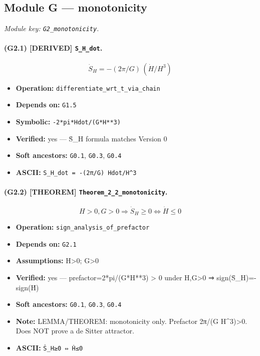 \documentclass[11pt,a4paper]{article}
\theoremstyle{remark}\newtheorem*{caution}{Caution}
\newcommand{\tagbox}[1]{\textsc{[#1]}}
\begin{document}
\subsection{Module G --- monotonicity}
\textit{Module key: \texttt{G2\_monotonicity}.}
\paragraph{(G2.1) \tagbox{DERIVED} \texttt{S\_H\_dot}.}
\begin{equation}
\dot S_H=-(2\pi/G)\,(\dot H/H^3)
\tag{G2.1}
\end{equation}
\begin{itemize}\setlength{\itemsep}{0.12em}
\item \textbf{Operation:} \texttt{differentiate\_wrt\_t\_via\_chain}
\item \textbf{Depends on:} \texttt{G1.5}
\item \textbf{Symbolic:} \texttt{-2*pi*Hdot/(G*H**3)}
\item \textbf{Verified:} yes --- Ṡ\_H formula matches Version 0
\item \textbf{Soft ancestors:} \texttt{G0.1}, \texttt{G0.3}, \texttt{G0.4}
\item \textbf{ASCII:} \texttt{S\_H\_dot = -(2π/G) Hdot/H^3}
\end{itemize}
\paragraph{(G2.2) \tagbox{THEOREM} \texttt{Theorem\_2\_2\_monotonicity}.}
\begin{equation}
H>0,G>0\Rightarrow \dot S_H\ge 0\Leftrightarrow \dot H\le 0
\tag{G2.2}
\end{equation}
\begin{itemize}\setlength{\itemsep}{0.12em}
\item \textbf{Operation:} \texttt{sign\_analysis\_of\_prefactor}
\item \textbf{Depends on:} \texttt{G2.1}
\item \textbf{Assumptions:} H>0; G>0
\item \textbf{Verified:} yes --- prefactor=2*pi/(G*H**3) > 0 under H,G>0 ⇒ sign(Ṡ\_H)=-sign(Ḣ)
\item \textbf{Soft ancestors:} \texttt{G0.1}, \texttt{G0.3}, \texttt{G0.4}
\item \textbf{Note:} LEMMA/THEOREM: monotonicity only. Prefactor 2π/(G H^3)>0. Does NOT prove a de Sitter attractor.
\item \textbf{ASCII:} \texttt{Ṡ\_H≥0 ⇔ Ḣ≤0}
\end{itemize}
\end{document}

